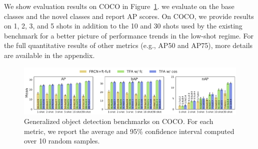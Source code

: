 \vspace{3mm}
We show evaluation results on COCO in Figure~\ref{fig:coco_bench}.
we evaluate on the base classes and the novel classes and report AP scores.
On COCO, we provide results on 1, 2, 3, and 5 shots in addition to the 10 and 30 shots used by the existing benchmark for a better picture of performance trends in the low-shot regime. For the full quantitative results of other metrics (e.g., AP50 and AP75), more details are available in the appendix.


\begin{figure}[ht]
	\begin{center}
		\centerline{\includegraphics[width=.9\linewidth]{figs/coco_benchmark_full.pdf}}
		\vspace{-5mm}
		\caption{Generalized object detection benchmarks on COCO. For each metric, we report the average and 95\% confidence interval computed over 10 random samples.}
		\label{fig:coco_bench}
	\end{center}
\end{figure}

